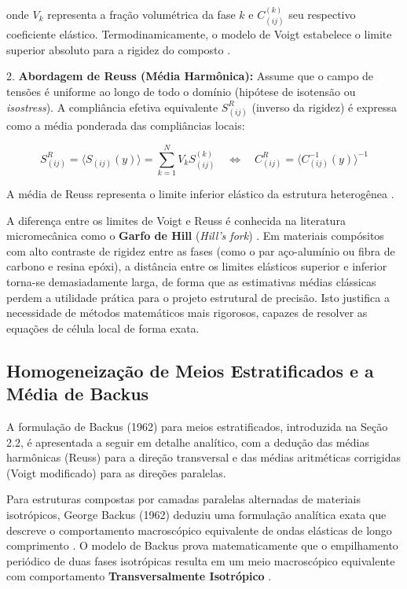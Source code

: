 onde $V_k$ representa a fração volumétrica da fase $k$ e $C_{(ij)}^{(k)}$ seu respectivo coeficiente elástico. Termodinamicamente, o modelo de Voigt estabelece o limite superior absoluto para a rigidez do composto \cite{bakhvalov1989}.

2. \textbf{Abordagem de Reuss (Média Harmônica):} Assume que o campo de tensões é uniforme ao longo de todo o domínio (hipótese de isotensão ou \textit{isostress}). A compliância efetiva equivalente $S_(i j)^R$ (inverso da rigidez) é expressa como a média ponderada das compliâncias locais:

\begin{equation}
  S_{(ij)}^R = \langle S_{(ij)}(y) \rangle = \sum_{k=1}^{N} V_k S_{(ij)}^{(k)} \quad \Leftrightarrow \quad C_{(ij)}^R = \langle C_{(ij)}^{-1}(y) \rangle^{-1}
  \label{eq:reuss_mean}
\end{equation}

A média de Reuss representa o limite inferior elástico da estrutura heterogênea \cite{bakhvalov1989}.

A diferença entre os limites de Voigt e Reuss é conhecida na literatura micromecânica como o \textbf{Garfo de Hill} (\textit{Hill's fork}) \cite{PartonReport}. Em materiais compósitos com alto contraste de rigidez entre as fases (como o par aço-alumínio ou fibra de carbono e resina epóxi), a distância entre os limites elásticos superior e inferior torna-se demasiadamente larga, de forma que as estimativas médias clássicas perdem a utilidade prática para o projeto estrutural de precisão. Isto justifica a necessidade de métodos matemáticos mais rigorosos, capazes de resolver as equações de célula local de forma exata.

\subsection{Homogeneização de Meios Estratificados e a Média de Backus}

A formulação de Backus (1962) para meios estratificados, introduzida na Seção 2.2, é apresentada a seguir em detalhe analítico, com a dedução das médias harmônicas (Reuss) para a direção transversal e das médias aritméticas corrigidas (Voigt modificado) para as direções paralelas.

Para estruturas compostas por camadas paralelas alternadas de materiais isotrópicos, George Backus (1962) deduziu uma formulação analítica exata que descreve o comportamento macroscópico equivalente de ondas elásticas de longo comprimento \cite{Backus1962}. O modelo de Backus prova matematicamente que o empilhamento periódico de duas fases isotrópicas resulta em um meio macroscópico equivalente com comportamento \textbf{Transversalmente Isotrópico} \cite{Backus1962}.

